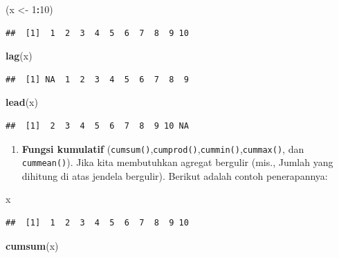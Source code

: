 \documentclass[]{book}
\newenvironment{Shaded}{\begin{snugshade}}{\end{snugshade}}
\newcommand{\KeywordTok}[1]{\textcolor[rgb]{0.13,0.29,0.53}{\textbf{#1}}}
\newcommand{\DecValTok}[1]{\textcolor[rgb]{0.00,0.00,0.81}{#1}}
\newcommand{\StringTok}[1]{\textcolor[rgb]{0.31,0.60,0.02}{#1}}
\newcommand{\OperatorTok}[1]{\textcolor[rgb]{0.81,0.36,0.00}{\textbf{#1}}}
\newcommand{\NormalTok}[1]{#1}
\providecommand{\tightlist}{%
  \setlength{\itemsep}{0pt}\setlength{\parskip}{0pt}}
\begin{document}
\begin{Shaded}
\begin{Highlighting}[]
\NormalTok{(x <-}\StringTok{ }\DecValTok{1}\OperatorTok{:}\DecValTok{10}\NormalTok{)}
\end{Highlighting}
\end{Shaded}

\begin{verbatim}
##  [1]  1  2  3  4  5  6  7  8  9 10
\end{verbatim}

\begin{Shaded}
\begin{Highlighting}[]
\KeywordTok{lag}\NormalTok{(x)}
\end{Highlighting}
\end{Shaded}

\begin{verbatim}
##  [1] NA  1  2  3  4  5  6  7  8  9
\end{verbatim}

\begin{Shaded}
\begin{Highlighting}[]
\KeywordTok{lead}\NormalTok{(x)}
\end{Highlighting}
\end{Shaded}

\begin{verbatim}
##  [1]  2  3  4  5  6  7  8  9 10 NA
\end{verbatim}

\begin{enumerate}
\def\labelenumi{\arabic{enumi}.}
\setcounter{enumi}{3}
\tightlist
\item
  \textbf{Fungsi kumulatif}
  (\texttt{cumsum()},\texttt{cumprod()},\texttt{cummin()},\texttt{cummax()},
  dan \texttt{cummean()}). Jika kita membutuhkan agregat bergulir (mis.,
  Jumlah yang dihitung di atas jendela bergulir). Berikut adalah contoh
  penerapannya:
\end{enumerate}

\begin{Shaded}
\begin{Highlighting}[]
\NormalTok{x}
\end{Highlighting}
\end{Shaded}

\begin{verbatim}
##  [1]  1  2  3  4  5  6  7  8  9 10
\end{verbatim}

\begin{Shaded}
\begin{Highlighting}[]
\KeywordTok{cumsum}\NormalTok{(x)}
\end{Highlighting}
\end{Shaded}
\end{document}
